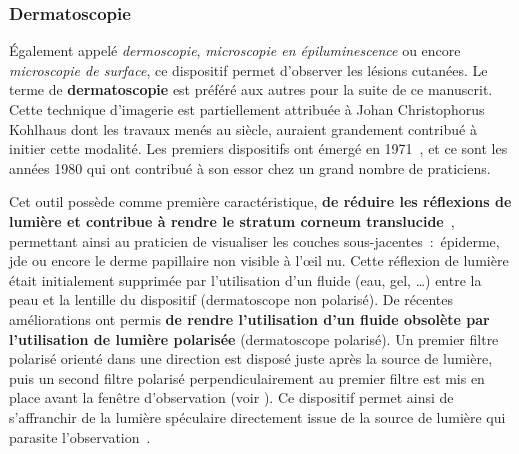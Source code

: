 \subsubsection{Dermatoscopie}
Également appelé \textit{dermoscopie}, \textit{microscopie en épiluminescence} ou encore \textit{microscopie de surface}, ce dispositif permet d’observer les lésions cutanées. Le terme de \textbf{dermatoscopie} est préféré aux autres pour la suite de ce manuscrit. Cette technique d’imagerie est partiellement attribuée à Johan Christophorus Kohlhaus dont les travaux menés au  siècle, auraient grandement contribué à initier cette modalité. Les premiers dispositifs ont émergé en 1971~\cite{MacKie1972}, et ce sont les années 1980 qui ont contribué à son essor chez un grand nombre de praticiens.\par

Cet outil possède comme première caractéristique, \textbf{de réduire les réflexions de lumière et contribue à rendre le stratum corneum translucide}~\cite{Katz2001}, permettant ainsi au praticien de visualiser les couches sous-jacentes~:~épiderme, \gls{jde} ou encore le derme papillaire non visible à l’œil nu. Cette réflexion de lumière était initialement supprimée par l’utilisation d’un fluide (eau, gel, \ldots) entre la peau et la lentille du dispositif (dermatoscope non polarisé). De récentes améliorations ont permis \textbf{de rendre l'utilisation d'un fluide obsolète par l'utilisation de lumière polarisée} (dermatoscope polarisé). Un premier filtre polarisé orienté dans une direction est disposé juste après la source de lumière, puis un second filtre polarisé perpendiculairement au premier filtre est mis en place avant la fenêtre d'observation (voir ). Ce dispositif permet ainsi de s'affranchir de la lumière spéculaire directement issue de la source de lumière qui parasite l'observation~\cite{CamposdoCarmo2008}.\par

